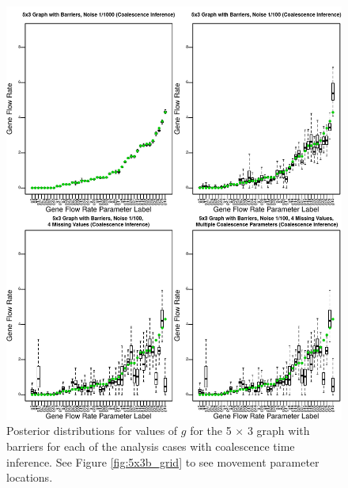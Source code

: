 \documentclass{article}
\begin{document}
\begin{figure}
\centering
     \includegraphics[scale=1]{figs/5x3boxplots}
    \caption{Posterior distributions for values of $g$ 
    for the 5 $\times$ 3 graph with barriers 
    for each of the analysis cases with coalescence time inference.
    See Figure \ref{fig:5x3b_grid} to see movement parameter locations.
}
    \label{fig:5x3boxplots_mult_gam}
\end{figure}
\end{document}
